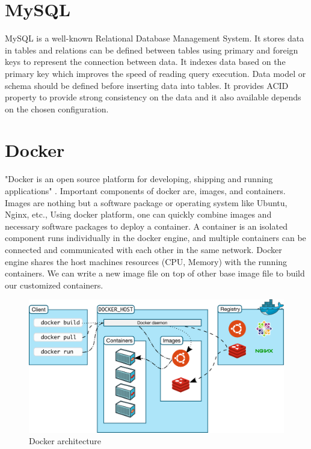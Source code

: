 	\section{MySQL}
	MySQL is a well-known Relational Database Management System. It stores data in tables and relations can be defined between tables using primary and foreign keys to represent the connection between data. It indexes data based on the primary key which improves the speed of reading query execution. Data model or schema should be defined before inserting data into tables. It provides ACID property to provide strong consistency on the data and it also available depends on the chosen configuration.
	
	\section{Docker}
	"Docker is an open source platform for developing, shipping and running applications" \cite{misc11}. Important components of docker are, images, and containers. Images are nothing but a software package or operating system like Ubuntu, Nginx, etc., Using docker platform, one can quickly combine images and necessary software packages to deploy a container. A container is an isolated component runs individually in the docker engine, and multiple containers can be connected and communicated with each other in the same network. Docker engine shares the host machines resources (CPU, Memory) with the running containers. We can write a new image file on top of other base image file to build our customized containers.
	
	\begin{figure}[!htbp] 
		\begin{center}
			\includegraphics[scale=0.04]{./images/png/docker_architecture}	
			\caption{Docker architecture \cite{misc14}}	
			\label{fig:docker_architecture}	
		\end{center}
	\end{figure}


